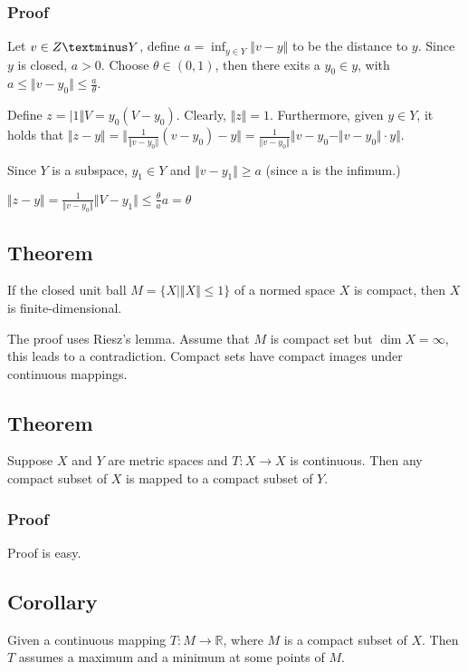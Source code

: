 \documentclass[11pt]{article}
\def\R{\mathbb{R}}
\begin{document}
\subsubsection{Proof}
\label{sec:org8b40176}
Let \(v\in Z \textminus Y\), define \(a = \inf_{y \in Y} \Vert v - y\Vert\) to
be the distance to \(y\). Since \(y\) is closed, \(a>0\). Choose \(\theta \in (0,
    1)\), then there exits a \(y_0 \in y\), with \(a \le \Vert v - y_0 \Vert \le
    \frac{a}{\theta}\).

Define \(z = \vert{1}{\Vert V = y_0}(V-y_0)\). Clearly, \(\Vert z\Vert = 1\).
Furthermore, given \(y\in Y\), it holds that \(\Vert z - y\Vert =
    \Vert\frac{1}{\Vert v - y_0\Vert}(v -y_0) - y\Vert = \frac{1}{\Vert v -
    y_0\Vert} \Vert v - y_0 - \Vert v-y_0\Vert\cdot y\Vert\).

Since \(Y\) is a subspace, \(y_1 \in Y\) and \(\Vert v - y_1\Vert \ge a\) (since a
is the infimum.)

\(\Vert z - y\Vert = \frac{1}{\Vert v - y_0\Vert} \Vert V - y_1\Vert \le
    \frac{\theta}{a}a = \theta\)
\subsection{Theorem}
\label{sec:orgfd3350c}
If the closed unit ball \(M=\{X \vert \Vert X \Vert \le 1\}\) of a normed space
\(X\) is compact, then \(X\) is finite-dimensional.

The proof uses Riesz's lemma. Assume that \(M\) is compact set but \(\dim X =
   \infty\), this leads to a contradiction. Compact sets have compact images
under continuous mappings.
\subsection{Theorem}
\label{sec:org59af6cf}
Suppose \(X\) and \(Y\) are metric spaces and \(T \colon X \rightarrow X\) is
continuous. Then any compact subset of \(X\) is mapped to a compact subset of
\(Y\).
\subsubsection{Proof}
\label{sec:orgcb86579}
Proof is easy.
\subsection{Corollary}
\label{sec:org58db106}
Given a continuous mapping \(T \colon M \rightarrow \R\), where \(M\) is a
compact subset of \(X\). Then \(T\) assumes a maximum and a minimum at some
points of \(M\).
\end{document}
